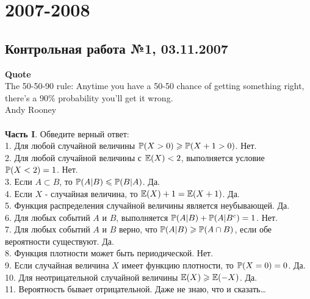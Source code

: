 \documentclass[12pt, a4paper]{article}\usepackage[]{graphicx}\usepackage[]{color}
\begin{document}
\section{2007-2008}



\subsection{Контрольная работа №1, 03.11.2007}

\textbf{Quote}\\
The 50-50-90 rule: Anytime you have a 50-50 chance of getting something right, there's a 90\% probability you'll get it wrong. \\
Andy Rooney\\ \\

\textbf{Часть I}. Обведите верный ответ: \\

1. Для любой случайной величины $\P(X>0)\ge \P(X+1>0)$. Нет. \\

2. Для любой случайной величины с $\E(X)<2$, выполняется условие $\P(X<2)=1$. Нет. \\

3. Если $A\subset B$, то $\P(A|B)\le \P(B|A)$. Да. \\

4. Если  $X$  - случайная величина, то $\E(X)+1=\E(X+1)$. Да. \\

5. Функция распределения случайной величины является неубывающей. Да. \\

6. Для любых событий $A$ и $B$, выполняется $\P(A|B)+\P(A|B^{c})=1$. Нет. \\

7. Для любых событий  $A$  и  $B$  верно, что $\P(A|B)\ge \P(A\cap
B)$, если обе вероятности существуют. Да.  \\

8. Функция плотности может быть периодической. Нет. \\

9. Если случайная величина $X$ имеет функцию плотности, то $\P(X=0)=0$. Да.  \\

10. Для неотрицательной случайной величины $\E(X)\ge \E(-X)$. Да. \\

11. Вероятность бывает отрицательной. Даже не знаю, что и сказать\ldots \\
\end{document}

